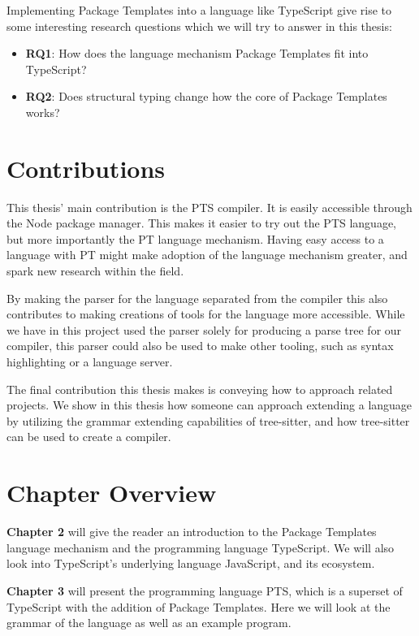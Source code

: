 Implementing Package Templates into a language like TypeScript give rise to some interesting research questions which we will try to answer in this thesis:

\begin{itemize}
    \item \textbf{RQ1}: How does the language mechanism Package Templates fit into TypeScript?
    \item \textbf{RQ2}: Does structural typing change how the core of Package Templates works?
\end{itemize}

\section{Contributions}\label{sec:contributions}

This thesis' main contribution is the PTS compiler.
It is easily accessible through the Node package manager.
This makes it easier to try out the PTS language, but more importantly the PT language mechanism.
Having easy access to a language with PT might make adoption of the language mechanism greater, and spark new research within the field.

By making the parser for the language separated from the compiler this also contributes to making creations of tools for the language more accessible.
While we have in this project used the parser solely for producing a parse tree for our compiler, this parser could also be used to make other tooling, such as syntax highlighting or a language server.

The final contribution this thesis makes is conveying how to approach related projects.
We show in this thesis how someone can approach extending a language by utilizing the grammar extending capabilities of tree-sitter, and how tree-sitter can be used to create a compiler.

\section{Chapter Overview}\label{sec:chapter-overview}


\textbf{Chapter 2} will give the reader an introduction to the Package Templates language mechanism and the programming language TypeScript.
We will also look into TypeScript's underlying language JavaScript, and its ecosystem.

\textbf{Chapter 3} will present the programming language PTS, which is a superset of TypeScript with the addition of Package Templates.
Here we will look at the grammar of the language as well as an example program.

